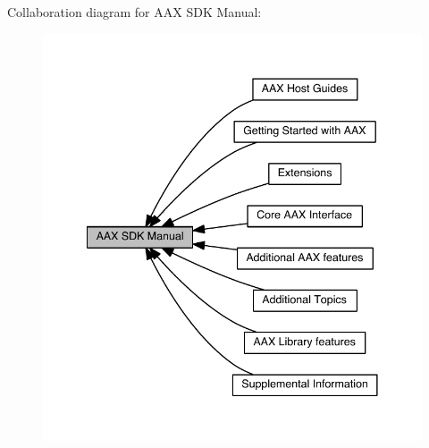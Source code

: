 Collaboration diagram for A\+A\+X S\+D\+K Manual\+:
\nopagebreak
\begin{figure}[H]
\begin{center}
\leavevmode
\includegraphics[width=341pt]{a00323}
\end{center}
\end{figure}
